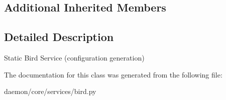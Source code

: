 \subsection*{Additional Inherited Members}


\subsection{Detailed Description}
\begin{DoxyVerb}Static Bird Service (configuration generation)\end{DoxyVerb}
 

The documentation for this class was generated from the following file\+:\begin{DoxyCompactItemize}
\item 
daemon/core/services/bird.\+py\end{DoxyCompactItemize}
